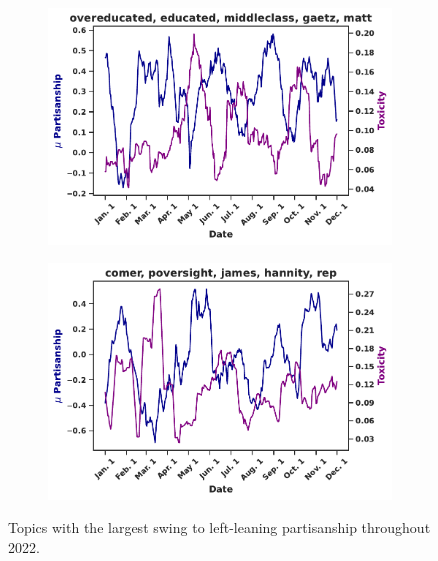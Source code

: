 \begin{figure}
\begin{subfigure}[l]{0.32\textwidth}
\end{subfigure}
\begin{subfigure}[l]{0.32\textwidth}
\includegraphics[width=1\columnwidth]{figures/overeducated-lib-final-20240425.pdf}
\caption{}
\label{fig:overeducated}
\end{subfigure}
\begin{subfigure}[l]{0.32\textwidth}
\includegraphics[width=1\columnwidth]{figures/comer-lib-final-20240425.pdf} 
\caption{}
\label{fig:comer}
\end{subfigure}


\begin{minipage}[l]{1\textwidth}
\caption{Topics with the largest swing to left-leaning partisanship throughout 2022. \label{fig:liberal-swing}}
\end{minipage}

\end{figure}

